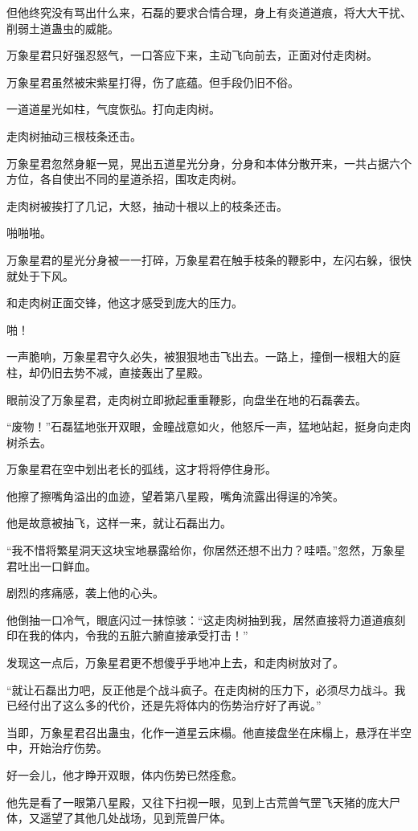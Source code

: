 \begin{this_body}
但他终究没有骂出什么来，石磊的要求合情合理，身上有炎道道痕，将大大干扰、削弱土道蛊虫的威能。

万象星君只好强忍怒气，一口答应下来，主动飞向前去，正面对付走肉树。

万象星君虽然被宋紫星打得，伤了底蕴。但手段仍旧不俗。

一道道星光如柱，气度恢弘。打向走肉树。

走肉树抽动三根枝条还击。

万象星君忽然身躯一晃，晃出五道星光分身，分身和本体分散开来，一共占据六个方位，各自使出不同的星道杀招，围攻走肉树。

走肉树被挨打了几记，大怒，抽动十根以上的枝条还击。

啪啪啪。

万象星君的星光分身被一一打碎，万象星君在触手枝条的鞭影中，左闪右躲，很快就处于下风。

和走肉树正面交锋，他这才感受到庞大的压力。

啪！

一声脆响，万象星君守久必失，被狠狠地击飞出去。一路上，撞倒一根粗大的庭柱，却仍旧去势不减，直接轰出了星殿。

眼前没了万象星君，走肉树立即掀起重重鞭影，向盘坐在地的石磊袭去。

“废物！”石磊猛地张开双眼，金瞳战意如火，他怒斥一声，猛地站起，挺身向走肉树杀去。

万象星君在空中划出老长的弧线，这才将将停住身形。

他擦了擦嘴角溢出的血迹，望着第八星殿，嘴角流露出得逞的冷笑。

他是故意被抽飞，这样一来，就让石磊出力。

“我不惜将繁星洞天这块宝地暴露给你，你居然还想不出力？哇唔。”忽然，万象星君吐出一口鲜血。

剧烈的疼痛感，袭上他的心头。

他倒抽一口冷气，眼底闪过一抹惊骇：“这走肉树抽到我，居然直接将力道道痕刻印在我的体内，令我的五脏六腑直接承受打击！”

发现这一点后，万象星君更不想傻乎乎地冲上去，和走肉树放对了。

“就让石磊出力吧，反正他是个战斗疯子。在走肉树的压力下，必须尽力战斗。我已经付出了这么多的代价，还是先将体内的伤势治疗好了再说。”

当即，万象星君召出蛊虫，化作一道星云床榻。他直接盘坐在床榻上，悬浮在半空中，开始治疗伤势。

好一会儿，他才睁开双眼，体内伤势已然痊愈。

他先是看了一眼第八星殿，又往下扫视一眼，见到上古荒兽气罡飞天猪的庞大尸体，又遥望了其他几处战场，见到荒兽尸体。


\end{this_body}
